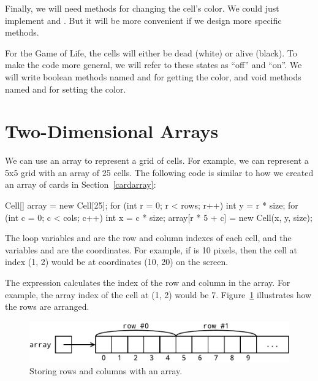 Finally, we will need methods for changing the cell's color.
We could just implement  and .
But it will be more convenient if we design more specific methods.

For the Game of Life, the cells will either be dead (white) or alive (black).
To make the code more general, we will refer to these states as ``off'' and ``on''.
We will write boolean methods named  and  for getting the color, and void methods named  and  for setting the color.

%


\section{Two-Dimensional Arrays}

We can use an array to represent a grid of cells.
For example, we can represent a 5x5 grid with an array of 25 cells.
The following code is similar to how we created an array of cards in Section~\ref{cardarray}:

\begin{code}
Cell[] array = new Cell[25];
for (int r = 0; r < rows; r++) {
    int y = r * size;
    for (int c = 0; c < cols; c++) {
        int x = c * size;
        array[r * 5 + c] = new Cell(x, y, size);
    }
}
\end{code}

The loop variables  and  are the row and column indexes of each cell, and the variables  and  are the coordinates.
For example, if  is 10 pixels, then the cell at index (1, 2) would be at coordinates (10, 20) on the screen.

The expression  calculates the index of the row and column in the array.
For example, the array index of the cell at (1, 2) would be 7.
Figure~\ref{fig:1D-array} illustrates how the rows are arranged.

\begin{figure}[!ht]
\begin{center}
\includegraphics[width=366pt]{figs/1D-array.pdf}
\caption{Storing rows and columns with an array.}
\label{fig:1D-array}
\end{center}
\end{figure}

